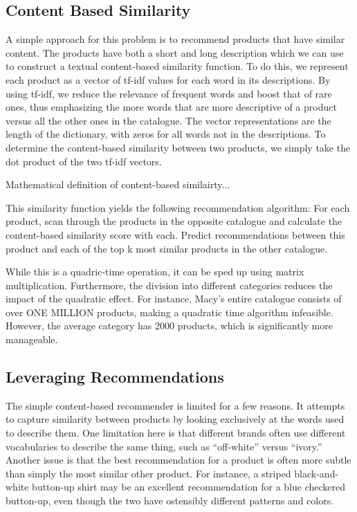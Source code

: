 \documentclass[11pt]{article}
\begin{document}
\subsection*{Content Based Similarity}
A simple approach for this problem is to recommend products that have similar
content. The products have both a short and long description which we can use to
construct a textual content-based similarity function. To do this, we represent each
product as a vector of tf-idf values for each word in its descriptions. By using
tf-idf, we reduce the relevance of frequent words and boost that of rare ones,
thus emphasizing the more words that are more descriptive of a product versus
all the other ones in the catalogue. The vector representations are the length 
of the dictionary, with zeros for all words not in the descriptions. To determine
the content-based similarity between two products, we simply take the dot 
product of the two tf-idf vectors. 

Mathematical definition of content-based similairty...

This similarity function yields the following recommendation algorithm: For each
product, scan through the products in the opposite catalogue and calculate the
content-based similarity score with each. Predict recommendations between this
product and each of the top k most similar products in the other catalogue.

While this is a quadric-time operation, it can be sped up using matrix
multiplication. Furthermore, the division into different categories reduces the
impact of the quadratic effect. For instance, Macy's entire catalogue consists
of over ONE MILLION products, making a quadratic time algorithm infeasible.
However, the average category has 2000 products, which is significantly more
manageable.

\subsection*{Leveraging Recommendations}
The simple content-based recommender is limited for a few reasons. It attempts
to capture similarity between products by looking exclusively at the words used
to describe them. One limitation here is that different brands often use
different vocabularies to describe the same thing, such as ``off-white'' versus
``ivory.'' Another issue is that the best recommendation for a product is often
more subtle than simply the most similar other product. For instance, a striped
black-and-white button-up shirt may be an excellent recommendation for a blue
checkered button-up, even though the two have ostensibly different patterns and
colors. 
\end{document}
